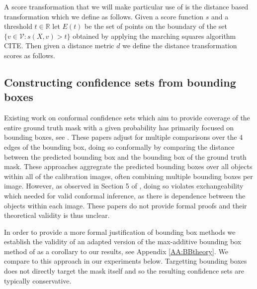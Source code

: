 A score transformation that we will make particular use of is the distance based transformation which we define as follows. Given a score function $s$ and a threshold $t \in \mathbb{R}$ let $E(t)$ be the set of points on the boundary of the set $\lbrace v \in \mathcal{V}: s(X,v) > t\rbrace $ obtained by applying the marching squares algorithm CITE. Then given a distance metric $d$ we define the distance transformation scores as follows.



\subsection{Constructing confidence sets from bounding boxes}
Existing work on conformal confidence sets which aim to provide coverage of the entire ground truth mask with a given probability has primarily focused on bounding boxes, see \citep{De2022, Andeol2023, Mukama2024}. These papers adjust for multiple comparisons over the 4 edges of the bounding box, doing so conformally by comparing the distance between the predicted bounding box and the bounding box of the ground truth mask. These approaches aggregrate the predicted bounding boxes over all objects within all of the calibration images, often combining multiple bounding boxes per image. However, as observed in Section 5 of \cite{De2022}, doing so violates exchangeability which needed for valid conformal inference, as there is dependence between the objects within each image. These papers do not provide formal proofs and their theoretical validity is thus unclear.

In order to provide a more formal justification of bounding box methods we establish the validity of an adapted version of the max-additive bounding box method of \cite{Andeol2023} as a corollary to our results, see Appendix \ref{AA:BBtheory}. We compare to this approach in our experiments below. Targetting bounding boxes does not directly target the mask itself and so the resulting confidence sets are typically conservative.


